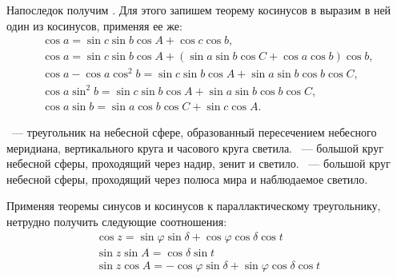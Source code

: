 Напоследок получим . Для этого запишем теорему косинусов в выразим в ней один из косинусов, применяя ее же:
\begin{gather}
	\cos a = \sin c \sin b \cos A + \cos c \cos b,\nonumber\\
	\cos a = \sin c \sin b \cos A + \left( \sin a \sin b \cos C + \cos a \cos b \right)\cos b,\nonumber\\
	\cos a - \cos a \cos^2 b = \sin c \sin b \cos A + \sin a \sin b \cos b \cos C,\nonumber\\
	\cos a \sin^2 b = \sin c \sin b \cos A + \sin a \sin b \cos b \cos C,\nonumber\\
	\cos a \sin b = \sin a \cos b \cos C + \sin c \cos A.
\end{gather}

~--- треугольник на небесной  сфере, образованный пересечением небесного меридиана, вертикального круга и часового круга светила. ~--- большой круг небесной сферы, проходящий через надир, зенит и светило. ~--- большой круг небесной сферы, проходящий через полюса мира и наблюдаемое светило.

Применяя теоремы синусов и косинусов к параллактическому треугольнику, нетрудно получить следующие соотношения:
\begin{gather}
	\cos z=\sin\varphi\sin\delta+\cos\varphi\cos\delta\cos t\\
	\sin z\sin A=\cos\delta\sin t\\
	\sin z\cos A=-\cos\varphi\sin\delta+\sin\varphi\cos\delta\cos t
\end{gather}
